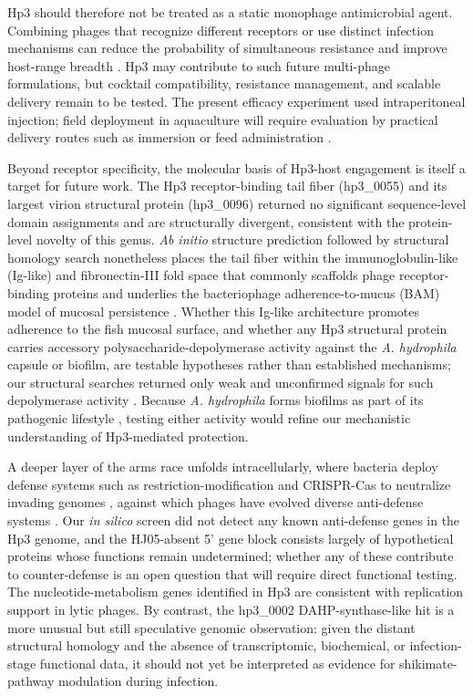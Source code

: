 \documentclass[11pt,a4paper]{article}
\begin{document}
Hp3 should therefore not be treated as a static monophage antimicrobial
agent. Combining phages that recognize different receptors or use
distinct infection mechanisms can reduce the probability of simultaneous
resistance and improve host-range breadth \citep{2021-Phage_Abedon,
2023-Developing_Oromi-Bosch}. Hp3 may contribute to such future
multi-phage formulations, but cocktail compatibility, resistance
management, and scalable delivery remain to be tested. The present
efficacy experiment used intraperitoneal injection; field deployment in
aquaculture will require evaluation by practical delivery routes such as
immersion or feed administration \citep{2021-Phage_Ramos-Vivas}.

Beyond receptor specificity, the molecular basis of Hp3-host engagement
is itself a target for future work. The Hp3 receptor-binding tail fiber
(hp3\_0055) and its largest virion structural protein (hp3\_0096)
returned no significant sequence-level domain assignments and are
structurally divergent, consistent with the protein-level novelty of
this genus. \emph{Ab initio} structure prediction followed by structural
homology search nonetheless places the tail fiber within the
immunoglobulin-like (Ig-like) and fibronectin-III fold space that commonly
scaffolds phage receptor-binding proteins and underlies the
bacteriophage adherence-to-mucus (BAM) model of mucosal persistence
\citep{2013-Bacteriophage_Barr, 2006-IgLike_Fraser, 2024-Bacteriophage_Wu}.
Whether this Ig-like architecture promotes adherence to the fish mucosal
surface, and whether any Hp3 structural protein carries accessory
polysaccharide-depolymerase activity against the \emph{A. hydrophila}
capsule or biofilm, are testable hypotheses rather than established
mechanisms; our structural searches returned only weak and unconfirmed
signals for such depolymerase activity \citep{2016-Bacteriophageencoded_Pires,
2023-Potential_Guo}. Because \emph{A. hydrophila} forms biofilms as part
of its pathogenic lifestyle \citep{2024-Tad_Tekedar}, testing either
activity would refine our mechanistic understanding of Hp3-mediated
protection.

A deeper layer of the arms race unfolds intracellularly, where bacteria
deploy defense systems such as restriction-modification and CRISPR-Cas
to neutralize invading genomes \citep{2010-Bacteriophage_Labrie},
against which phages have evolved diverse anti-defense systems
\citep{2024-Growing_Murtazalieva}. Our \emph{in silico} screen did not detect
any known anti-defense genes in the Hp3 genome, and the HJ05-absent 5'
gene block consists largely of hypothetical proteins whose functions
remain undetermined; whether any of these contribute to counter-defense
is an open question that will require direct functional testing. The
nucleotide-metabolism genes identified in Hp3 are consistent with
replication support in lytic phages. By contrast, the hp3\_0002
DAHP-synthase-like hit is a more unusual but still speculative genomic
observation: given the distant structural homology and the absence of
transcriptomic, biochemical, or infection-stage functional data, it
should not yet be interpreted as evidence for shikimate-pathway
modulation during infection.
\end{document}
